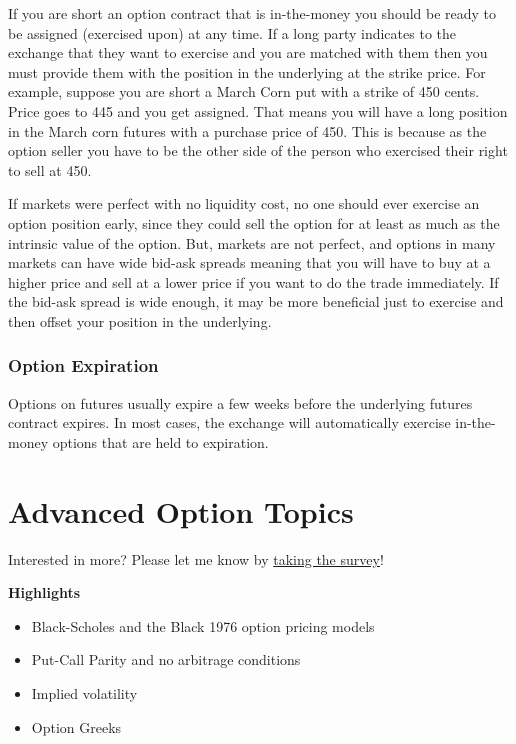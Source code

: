 \documentclass[
  letterpaper,
  DIV=11,
  numbers=noendperiod]{scrreprt}
\begin{document}
If you are short an option contract that is in-the-money you should be
ready to be assigned (exercised upon) at any time. If a long party
indicates to the exchange that they want to exercise and you are matched
with them then you must provide them with the position in the underlying
at the strike price. For example, suppose you are short a March Corn put
with a strike of 450 cents. Price goes to 445 and you get assigned. That
means you will have a long position in the March corn futures with a
purchase price of 450. This is because as the option seller you have to
be the other side of the person who exercised their right to sell at
450.

If markets were perfect with no liquidity cost, no one should ever
exercise an option position early, since they could sell the option for
at least as much as the intrinsic value of the option. But, markets are
not perfect, and options in many markets can have wide bid-ask spreads
meaning that you will have to buy at a higher price and sell at a lower
price if you want to do the trade immediately. If the bid-ask spread is
wide enough, it may be more beneficial just to exercise and then offset
your position in the underlying.

\hypertarget{option-expiration}{%
\subsection{Option Expiration}\label{option-expiration}}

Options on futures usually expire a few weeks before the underlying
futures contract expires. In most cases, the exchange will automatically
exercise in-the-money options that are held to expiration.


\hypertarget{advanced-option-topics}{%
\chapter{Advanced Option Topics}\label{advanced-option-topics}}

{Interested in more? Please let me know by}
\href{https://forms.gle/Q3VByCQZHjfQSy9D7}{taking the survey}!

\textbf{Highlights}

\begin{itemize}
\item
  Black-Scholes and the Black 1976 option pricing models
\item
  Put-Call Parity and no arbitrage conditions
\item
  Implied volatility
\item
  Option Greeks
\end{itemize}
\end{document}
